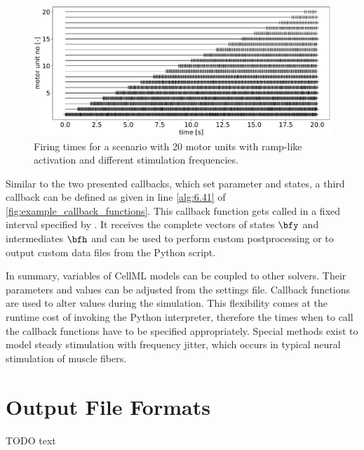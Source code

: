 \begin{figure}%
  \centering%
  \includegraphics[width=\textwidth]{images/implementation/firing_times_ramp1.pdf}%
  \caption{Firing times for a scenario with 20 motor units with ramp-like activation and different stimulation frequencies.}%
  \label{fig:firing_times_ramp}%
\end{figure}%

Similar to the two presented callbacks, which set parameter and states, a third callback  can be defined as given in line \ref{alg:6.41} of \cref{fig:example_callback_functions}. This callback function gets called in a fixed interval specified by . It receives the complete vectors of states $\bfy$ and intermediates $\bfh$ and can be used to perform custom postprocessing or to output custom data files from the Python script.

In summary, variables of CellML models can be coupled to other solvers. Their parameters and values can be adjusted from the settings file. Callback functions are used to alter values during the simulation. This flexibility comes at the runtime cost of invoking the Python interpreter, therefore the times when to call the callback functions have to be specified appropriately. Special methods exist to model steady stimulation with frequency jitter, which occurs in typical neural stimulation of muscle fibers.

\section{Output File Formats}\label{sec:output_file_formats}

TODO text

